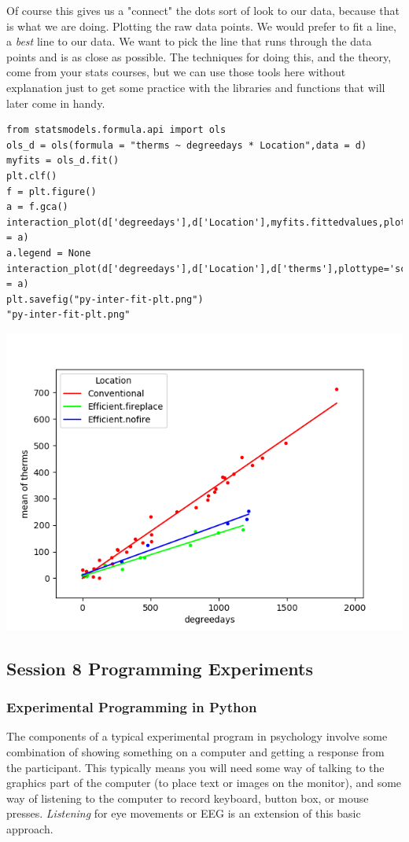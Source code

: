 \documentclass{article}
\begin{document}
\begin{enumerate}
Of course this gives us a "connect" the dots sort of look to our data, because that is what we are doing. Plotting the raw data points. We would prefer to fit a line, a \emph{best} line to our data. We want to pick the line that runs through the data points and is as close as possible. The techniques for doing this, and the theory, come from your stats courses, but we can use those tools here without explanation just to get some practice with the libraries and functions that will later come in handy. 

\begin{verbatim}
from statsmodels.formula.api import ols
ols_d = ols(formula = "therms ~ degreedays * Location",data = d)
myfits = ols_d.fit()
plt.clf()
f = plt.figure()
a = f.gca()
interaction_plot(d['degreedays'],d['Location'],myfits.fittedvalues,plottype="line",ax = a)
a.legend = None
interaction_plot(d['degreedays'],d['Location'],d['therms'],plottype='scatter',ax = a)
plt.savefig("py-inter-fit-plt.png")
"py-inter-fit-plt.png"
\end{verbatim}

\begin{center}
\includegraphics[width=.9\linewidth]{py-inter-fit-plt.png}
\end{center}
\end{enumerate}
\subsection{Session 8 Programming Experiments}
\label{sec:orgfbb49e2}
\subsubsection{Experimental Programming in Python}
\label{sec:orgb17e8b0}
The components of a typical experimental program in psychology involve some combination of showing something on a computer and getting a response from the participant. This typically means you will need some way of talking to the graphics part of the computer (to place text or images on the monitor), and some way of listening to the computer to record keyboard, button box, or mouse presses. \emph{Listening} for eye movements or EEG is an extension of this basic approach. 
\end{document}
